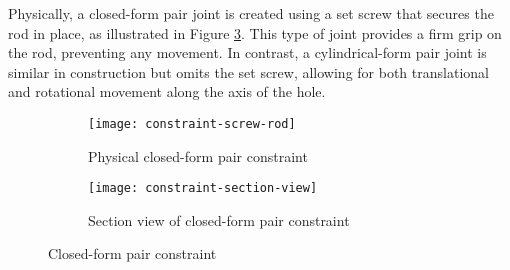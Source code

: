 Physically, a closed-form pair joint is created using a set screw that secures the rod in place, as illustrated in Figure \ref{fig:closed-constraint}. This type of joint provides a firm grip on the rod, preventing any movement. In contrast, a cylindrical-form pair joint is similar in construction but omits the set screw, allowing for both translational and rotational movement along the axis of the hole.

\begin{figure} [H]
    \centering
    \begin{subfigure}[t]{0.45\textwidth}
        \texttt{[image: constraint-screw-rod]}
        \caption{Physical closed-form pair constraint}
        \label{fig:cons_physical}
    \end{subfigure}
    \begin{subfigure}[t]{0.45\textwidth}
        \texttt{[image: constraint-section-view]}
        \caption{Section view of closed-form pair constraint}
        \label{fig:cons_physical_section}
    \end{subfigure}
    \caption{Closed-form pair constraint}
    \label{fig:closed-constraint}
\end{figure}
